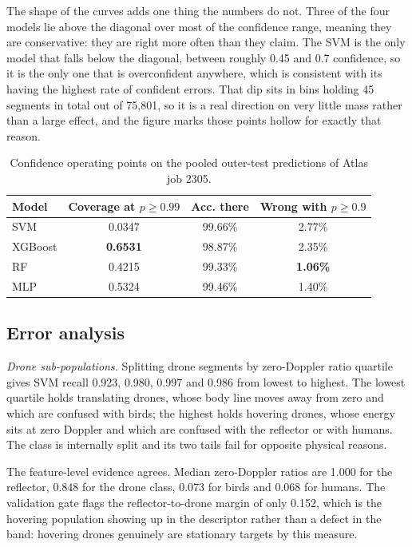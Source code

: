 \documentclass[conference]{IEEEtran}
\begin{document}
The shape of the curves adds one thing the numbers do not. Three of the four models lie above the diagonal over most of the confidence range, meaning they are conservative: they are right more often than they claim. The SVM is the only model that falls below the diagonal, between roughly 0.45 and 0.7 confidence, so it is the only one that is overconfident anywhere, which is consistent with its having the highest rate of confident errors. That dip sits in bins holding 45 segments in total out of 75,801, so it is a real direction on very little mass rather than a large effect, and the figure marks those points hollow for exactly that reason.

\begin{table}[t]
\centering
\caption{Confidence operating points on the pooled outer-test predictions of Atlas job 2305.}
\label{tab:conf}
\footnotesize
\begin{tabular}{lccc}
\toprule
Model & Coverage at $p\ge0.99$ & Acc. there & Wrong with $p\ge0.9$ \\
\midrule
SVM & 0.0347 & 99.66\% & 2.77\% \\
XGBoost & \textbf{0.6531} & 98.87\% & 2.35\% \\
RF & 0.4215 & 99.33\% & \textbf{1.06\%} \\
MLP & 0.5324 & 99.46\% & 1.40\% \\
\bottomrule
\end{tabular}
\end{table}

\subsection{Error analysis}
\emph{Drone sub-populations.} Splitting drone segments by zero-Doppler ratio quartile gives SVM recall 0.923, 0.980, 0.997 and 0.986 from lowest to highest. The lowest quartile holds translating drones, whose body line moves away from zero and which are confused with birds; the highest holds hovering drones, whose energy sits at zero Doppler and which are confused with the reflector or with humans. The class is internally split and its two tails fail for opposite physical reasons.

The feature-level evidence agrees. Median zero-Doppler ratios are 1.000 for the reflector, 0.848 for the drone class, 0.073 for birds and 0.068 for humans. The validation gate flags the reflector-to-drone margin of only 0.152, which is the hovering population showing up in the descriptor rather than a defect in the band: hovering drones genuinely are stationary targets by this measure.
\end{document}
